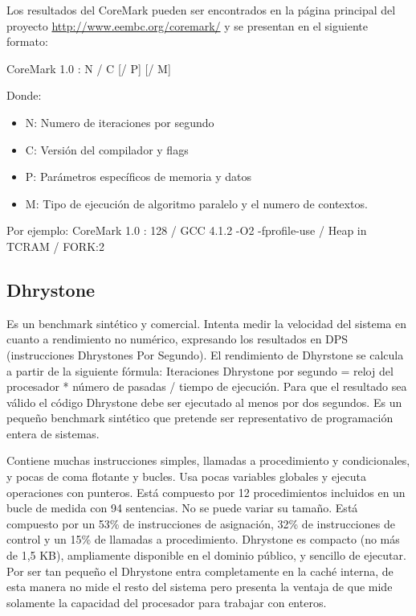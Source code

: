 Los resultados del CoreMark pueden ser encontrados en la página principal   
del proyecto \url{http://www.eembc.org/coremark/} y se presentan en el siguiente formato:
	
CoreMark 1.0 : N / C [/ P] [/ M]
	
Donde:
\begin{itemize}
\item N: Numero de iteraciones por segundo 
\item C: Versión del compilador y flags
\item P: Parámetros específicos de memoria y datos
\item M: Tipo de ejecución de algoritmo paralelo y el numero de contextos.
\end{itemize}	 
	
Por ejemplo: CoreMark 1.0 : 128 / GCC 4.1.2 -O2 -fprofile-use / Heap
in TCRAM / FORK:2
	
\subsection{Dhrystone}

 		Es un benchmark sintético y comercial. Intenta medir la velocidad del sistema en cuanto a rendimiento no numérico, expresando los
		resultados en DPS (instrucciones Dhrystones Por Segundo). El rendimiento de Dhyrstone se calcula a partir de la siguiente fórmula: Iteraciones
		Dhrystone por segundo = reloj del procesador * número de pasadas / tiempo de ejecución. Para que el resultado sea válido el código Dhrystone debe
		ser ejecutado al menos por dos segundos. Es un pequeño benchmark sintético que pretende ser representativo de programación entera de
		sistemas. 
		
		Contiene muchas instrucciones simples, llamadas a procedimiento y condicionales, y pocas de coma flotante y bucles. Usa pocas variables globales y
		ejecuta operaciones con punteros. Está compuesto por 12 procedimientos incluidos en un bucle de medida con 94 sentencias. No se puede variar su
		tamaño. Está compuesto por un 53\% de instrucciones de asignación, 32\% de instrucciones de control y un 15\% de llamadas a procedimiento.
		Dhrystone es compacto (no más de 1,5 KB), ampliamente disponible en el dominio público, y sencillo de ejecutar. Por ser tan pequeño el Dhrystone
		entra completamente en la caché interna, de esta manera no mide el resto del sistema pero presenta la ventaja de que mide solamente la capacidad
		del procesador para trabajar con enteros.
		

